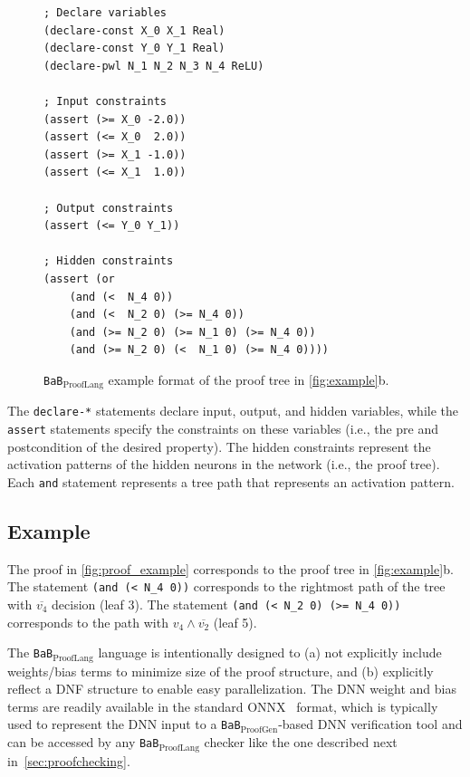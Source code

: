 \documentclass[oneside,11pt,dvipsnames]{book}
\numberwithin{equation}{section}
\theoremstyle{definition}
\theoremstyle{remark}
\newcommand{\tvn}[1]{\iftoggle{usecomment}{{\color{red}{[TVN]: #1}}}{}}
\newcommand{\hd}[1]{\iftoggle{usecomment}{{\color{blue}{[HD]: #1}}}{}}
\newcommand{\proofgen}{\texttt{BaB$_{\text{ProofGen}}$}}
\newcommand{\prooflang}{\texttt{BaB$_{\text{ProofLang}}$}}
\begin{document}
\begin{figure}
\begin{lstlisting}[style=SMTLIB-style, language=SMTLIB, basicstyle=\ttfamily\scriptsize]
; Declare variables
(declare-const X_0 X_1 Real)
(declare-const Y_0 Y_1 Real)
(declare-pwl N_1 N_2 N_3 N_4 ReLU)

; Input constraints
(assert (>= X_0 -2.0))
(assert (<= X_0  2.0))
(assert (>= X_1 -1.0))
(assert (<= X_1  1.0))

; Output constraints
(assert (<= Y_0 Y_1)) 

; Hidden constraints
(assert (or 
    (and (<  N_4 0))
    (and (<  N_2 0) (>= N_4 0))
    (and (>= N_2 0) (>= N_1 0) (>= N_4 0))
    (and (>= N_2 0) (<  N_1 0) (>= N_4 0))))
\end{lstlisting}
\caption{\prooflang{} example format of the proof tree in \autoref{fig:example}b. 
}
\label{fig:proof_example}
\end{figure}


The \texttt{declare-*} statements declare input, output, and hidden variables, while the \texttt{assert} statements specify the constraints on these variables (i.e., the pre and postcondition of the desired property).
The hidden constraints represent the activation patterns of the hidden neurons in the network (i.e., the proof tree). Each \texttt{and} statement represents a tree path that represents an activation pattern. 



\subsection{Example} The proof in \autoref{fig:proof_example} corresponds to the proof tree in \autoref{fig:example}b. The statement \texttt{(and (< N\_4 0))} corresponds to the rightmost path of the tree with $\overline{v_4}$ decision (leaf 3).  The statement \texttt{(and (< N\_2 0) (>= N\_4 0))} corresponds to the path with $v_4 \land \overline{v_2}$ (leaf 5). 

The \prooflang{} language is intentionally designed to (a) not explicitly include weights/bias terms to minimize size of the proof structure, and (b) explicitly reflect a DNF structure to enable easy parallelization.
The DNN weight and bias terms are readily available in the standard ONNX~\cite{onnx} format, which is typically used to represent the DNN input to a \proofgen{}-based DNN verification tool and can be accessed by any \prooflang{} checker like the one described next in~\autoref{sec:proofchecking}.
\end{document}
